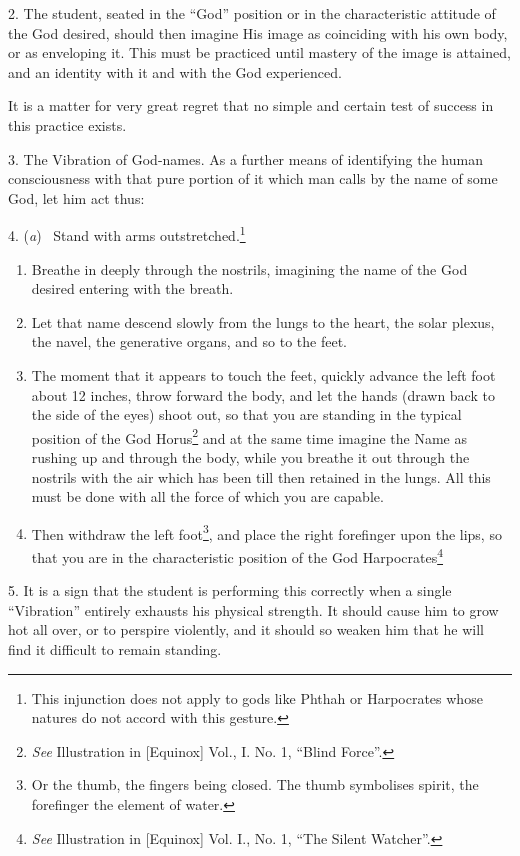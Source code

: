 2. The student, seated in the \enquote{God} position or in the characteristic attitude of the God desired, should then imagine His image as coinciding with his own body, or as enveloping it. This must be practiced until mastery of the image is attained, and an identity with it and with the God experienced.

It is a matter for very great regret that no simple and certain test of success in this practice exists.

3. The Vibration of God-names. As a further means of identifying the human consciousness with that pure portion of it which man calls by the name of some God, let him act thus:

4. (\textit{a}) \-\ Stand with arms outstretched.\footnote{This injunction does not apply to gods like Phthah or Harpocrates whose natures do not accord with this gesture.} \begin{enumerate}[start=2, label=(\textit{\alph*}), leftmargin=3.57\parindent]
\item Breathe in deeply through the nostrils, imagining the name of the God desired entering with the breath.
\item Let that name descend slowly from the lungs to the heart, the solar plexus, the navel, the generative organs, and so to the feet.
\item The moment that it appears to touch the feet, quickly advance the left foot about 12 inches, throw forward the body, and let the hands (drawn back to the side of the eyes) shoot out, so that you are standing in the typical position of the God Horus\footnote{\textit{See} Illustration in [Equinox] Vol., I. No. 1, \enquote{Blind Force}.} and at the same time imagine the Name as rushing up and through the body, while you breathe it out through the nostrils with the air which has been till then retained in the lungs. All this must be done with all the force of which you are capable.
\item Then withdraw the left foot\footnote{Or the thumb, the fingers being closed. The thumb symbolises spirit, the forefinger the element of water.}, and place the right forefinger upon the lips, so that you are in the characteristic position of the God Harpocrates\footnote{\textit{See} Illustration in [Equinox] Vol. I., No. 1, \enquote{The Silent Watcher}.}
\end{enumerate}

5. It is a sign that the student is performing this correctly when a single \enquote{Vibration} entirely exhausts his physical strength. It should cause him to grow hot all over, or to perspire violently, and it should so weaken him that he will find it difficult to remain standing.

